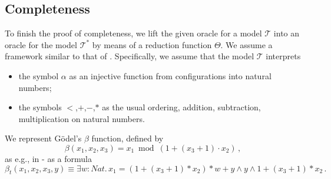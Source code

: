 \subsection{Completeness}\label{app:completeness}
To finish the proof of completeness, we lift the given oracle for a model $\mathcal{T}$
into an oracle for the model $\mathcal{T}^*$ by means of a reduction function $\Theta$.
We assume a framework similar to that of \cite{StefanescuCMMSR19}.
Specifically, we assume that the model $\mathcal{T}$ interprets
\begin{itemize}
    \item the symbol $\alpha$ as an injective function from configurations into natural numbers;
    \item the symbols $<$,$+$,$-$,$*$ as the usual ordering, addition, subtraction, multiplication on natural numbers.
\end{itemize}
We represent Gödel's $\beta$ function, defined by
\begin{equation*}
 \beta(x_1, x_2, x_3) = x_1 \bmod (1 + (x_3 + 1) \cdot x_2) \, ,
\end{equation*}
as e.g., in \cite{mendelson1997introduction} - as a formula
\begin{equation*}
    \beta_t(x_1, x_2, x_3, y) \equiv \exists w : \mathit{Nat}.\, x_1 = (1 + (x_3 + 1) * x_2) * w + y \land y \land 1 + (x_3 + 1) * x_2 \, .
\end{equation*}



